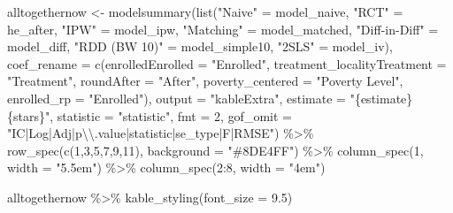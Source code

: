 \documentclass[
  letterpaper,
  DIV=11,
  numbers=noendperiod]{scrartcl}
\newenvironment{Shaded}{\begin{snugshade}}{\end{snugshade}}
\newcommand{\AttributeTok}[1]{\textcolor[rgb]{0.40,0.45,0.13}{#1}}
\newcommand{\DecValTok}[1]{\textcolor[rgb]{0.68,0.00,0.00}{#1}}
\newcommand{\FloatTok}[1]{\textcolor[rgb]{0.68,0.00,0.00}{#1}}
\newcommand{\FunctionTok}[1]{\textcolor[rgb]{0.28,0.35,0.67}{#1}}
\newcommand{\NormalTok}[1]{\textcolor[rgb]{0.00,0.23,0.31}{#1}}
\newcommand{\OtherTok}[1]{\textcolor[rgb]{0.00,0.23,0.31}{#1}}
\newcommand{\SpecialCharTok}[1]{\textcolor[rgb]{0.37,0.37,0.37}{#1}}
\newcommand{\StringTok}[1]{\textcolor[rgb]{0.13,0.47,0.30}{#1}}
\begin{document}
\begin{Shaded}
\begin{Highlighting}[numbers=left,,]
\NormalTok{alltogethernow }\OtherTok{\textless{}{-}} \FunctionTok{modelsummary}\NormalTok{(}\FunctionTok{list}\NormalTok{(}\StringTok{"Naive"} \OtherTok{=}\NormalTok{ model\_naive,}
                                    \StringTok{"RCT"} \OtherTok{=}\NormalTok{ he\_after,}
                                    \StringTok{"IPW"} \OtherTok{=}\NormalTok{ model\_ipw,}
                                    \StringTok{"Matching"} \OtherTok{=}\NormalTok{ model\_matched,}
                                    \StringTok{"Diff{-}in{-}Diff"} \OtherTok{=}\NormalTok{ model\_diff,}
                                    \StringTok{"RDD (BW 10)"} \OtherTok{=}\NormalTok{ model\_simple10,}
                                    \StringTok{"2SLS"} \OtherTok{=}\NormalTok{ model\_iv),}
             \AttributeTok{coef\_rename =} \FunctionTok{c}\NormalTok{(}\AttributeTok{enrolledEnrolled =} \StringTok{"Enrolled"}\NormalTok{,}
                             \AttributeTok{treatment\_localityTreatment =} \StringTok{"Treatment"}\NormalTok{,}
                             \AttributeTok{roundAfter =} \StringTok{"After"}\NormalTok{,}
                             \AttributeTok{poverty\_centered =} \StringTok{"Poverty Level"}\NormalTok{,}
                             \AttributeTok{enrolled\_rp =} \StringTok{"Enrolled"}\NormalTok{),}
             \AttributeTok{output =} \StringTok{"kableExtra"}\NormalTok{,}
             \AttributeTok{estimate =} \StringTok{"\{estimate\}\{stars\}"}\NormalTok{,}
             \AttributeTok{statistic =} \StringTok{"statistic"}\NormalTok{,}
             \AttributeTok{fmt =}  \DecValTok{2}\NormalTok{,}
             \AttributeTok{gof\_omit =} \StringTok{"IC|Log|Adj|p}\SpecialCharTok{\textbackslash{}\textbackslash{}}\StringTok{.value|statistic|se\_type|F|RMSE"}\NormalTok{) }\SpecialCharTok{\%\textgreater{}\%} 
  \FunctionTok{row\_spec}\NormalTok{(}\FunctionTok{c}\NormalTok{(}\DecValTok{1}\NormalTok{,}\DecValTok{3}\NormalTok{,}\DecValTok{5}\NormalTok{,}\DecValTok{7}\NormalTok{,}\DecValTok{9}\NormalTok{,}\DecValTok{11}\NormalTok{), }\AttributeTok{background =} \StringTok{"\#8DE4FF"}\NormalTok{) }\SpecialCharTok{\%\textgreater{}\%} 
  \FunctionTok{column\_spec}\NormalTok{(}\DecValTok{1}\NormalTok{, }\AttributeTok{width =} \StringTok{"5.5em"}\NormalTok{) }\SpecialCharTok{\%\textgreater{}\%} 
  \FunctionTok{column\_spec}\NormalTok{(}\DecValTok{2}\SpecialCharTok{:}\DecValTok{8}\NormalTok{, }\AttributeTok{width =} \StringTok{"4em"}\NormalTok{)}


\NormalTok{alltogethernow }\SpecialCharTok{\%\textgreater{}\%} 
  \FunctionTok{kable\_styling}\NormalTok{(}\AttributeTok{font\_size =} \FloatTok{9.5}\NormalTok{)}
\end{Highlighting}
\end{Shaded}
\end{document}

